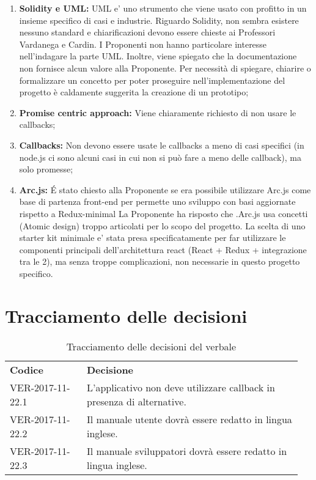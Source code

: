 \documentclass[VER-2017-11-22.tex]{subfiles}
\begin{document}
\begin{enumerate}
	\item \textbf{Solidity e UML:} UML e' uno strumento che viene usato con profitto in un insieme specifico di casi e industrie. Riguardo Solidity, non sembra esistere nessuno standard e chiarificazioni devono essere chieste ai Professori Vardanega e Cardin. I Proponenti non hanno particolare interesse nell'indagare la parte UML. Inoltre, viene spiegato che la documentazione non fornisce alcun valore alla Proponente. Per necessità di spiegare, chiarire o formalizzare un concetto per poter proseguire nell'implementazione del progetto è caldamente suggerita la creazione di un prototipo;
	\item \textbf{Promise centric approach:} Viene chiaramente richiesto di non usare le callbacks;
	\item \textbf{Callbacks:} Non devono essere usate le callbacks a meno di casi specifici (in node.js ci sono alcuni casi in cui non si può fare a meno delle callback), ma solo promesse;
	\item \textbf{Arc.js:} \'{E} stato chiesto alla Proponente se era possibile utilizzare Arc.js come base di partenza front-end per permette uno sviluppo con basi aggiornate rispetto a Redux-minimal La Proponente ha risposto che .Arc.js usa concetti (Atomic design) troppo articolati per lo scopo del progetto. La scelta di uno starter kit minimale e' stata presa specificatamente per far utilizzare le  componenti principali dell'architettura react (React + Redux + integrazione tra le 2), ma senza troppe complicazioni, non necessarie in questo progetto specifico.
\end{enumerate}
\section{Tracciamento delle decisioni}
\begin{table}[H]
	\begin{center}
		\begin{tabu} to 
			\tableHeaderStyle
			\textbf{Codice} & \textbf{Decisione} \\
			VER-2017-11-22.1 & L'applicativo non deve utilizzare callback in presenza di alternative. \\
			VER-2017-11-22.2 & Il manuale utente dovrà essere redatto in lingua inglese. \\
			VER-2017-11-22.3 & Il manuale sviluppatori dovrà essere redatto in lingua inglese. \\
		\end{tabu}
		\caption{Tracciamento delle decisioni del verbale}
	\end{center}
\end{table}
\end{document}
